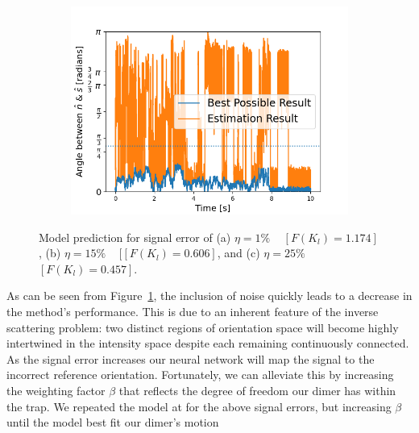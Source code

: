 \documentclass[final,  3p]{elsarticle}
\begin{document}
\begin{figure}[h]
\begin{subfigure}{0.32\textwidth}
	\includegraphics[width=\textwidth]{./Images/fig6c.png}
\end{subfigure}
\caption{\label{fig:epsilon}
%
Model prediction for signal error of (a) $\eta=1\%$ ~
$[F(K_l)=1.174]$, (b) $\eta=15\%$ ~ [$[F(K_l)=0.606]$, and (c)
$\eta=25\%$ ~ $[F(K_l)=0.457]$.
%
}
\end{figure}

As can be seen from Figure~\ref{fig:epsilon}, the inclusion of noise
quickly leads to a decrease in the method's performance.  This is due
to an inherent feature of the inverse scattering problem: two distinct
regions of orientation space will become highly intertwined in the
intensity space despite each remaining continuously connected.  As the
signal error increases our neural network will map the signal to the
incorrect reference orientation.
%
Fortunately, we can alleviate this by increasing the weighting factor $\beta$ that reflects the degree of freedom our dimer has within the trap. We repeated the model at for the above signal errors, but increasing $\beta$ until the model best fit our dimer's motion 
\end{document}
